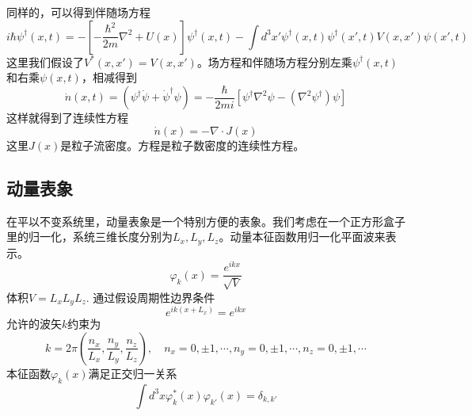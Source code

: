 \documentclass[12pt]{article}
\begin{document}
同样的，可以得到伴随场方程
\begin{equation*}
    i\hbar\psi^\dagger(x,t)=-\left[-\frac{\hbar^2}{2m}\nabla^2+U(x)\right]\psi^\dagger(x,t)-\int d^3x'\psi^\dagger(x,t)\psi^\dagger(x',t)V(x,x')\psi(x',t)
\end{equation*}
这里我们假设了$V^*(x,x')=V(x,x')$。场方程和伴随场方程分别左乘$\psi^\dagger(x,t)$和右乘$\psi(x,t)$，相减得到
\begin{equation*}
    \dot{n}(x,t)=(\psi^\dagger\dot{\psi}+\dot{\psi}^\dagger\psi)=-\frac{\hbar}{2mi}[\psi^\dagger\nabla^2\psi-(\nabla^2\psi^\dagger)\psi]
\end{equation*}
这样就得到了连续性方程
\begin{equation*}
    \dot{n}(x)=-\nabla\cdot J(x)
\end{equation*}
这里$J(x)$是粒子流密度。方程是粒子数密度的连续性方程。
\subsection{动量表象}
在平以不变系统里，动量表象是一个特别方便的表象。我们考虑在一个正方形盒子里的归一化，系统三维长度分别为$L_x,L_y,L_z$。动量本征函数用归一化平面波来表示。
\begin{equation*}
    \varphi_k(x)=\frac{e^{ikx}}{\sqrt{V}}
\end{equation*}
体积$V=L_xL_yL_z$. 通过假设周期性边界条件
\begin{equation*}
    e^{ik(x+L_x)}=e^{ikx}
\end{equation*}
允许的波矢$k$约束为
\begin{equation*}
    k=2\pi\left(\frac{n_x}{L_x},\frac{n_y}{L_y},\frac{n_z}{L_z}\right),\quad n_x=0,\pm1,\cdots,n_y=0,\pm1,\cdots,n_z=0,\pm1,\cdots
\end{equation*}
本征函数$\varphi_k(x)$满足正交归一关系
\begin{equation*}
    \int d^3x\varphi_k^*(x)\varphi_{k'}(x)=\delta_{k,k'}
\end{equation*}
\end{document}
